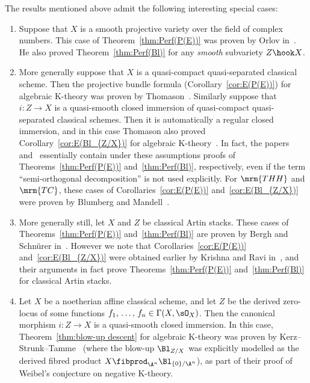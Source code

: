 The results mentioned above admit the following interesting special cases:
\begin{enumerate}
\item Suppose that $X$ is a smooth projective variety over the field of complex numbers. This case of Theorem~\ref{thm:Perf(P(E))} was proven by Orlov in~\cite{OrlovSOD}. He also proved Theorem~\ref{thm:Perf(Bl)} for any \emph{smooth} subvariety $Z \hook X$.
\item More generally suppose that $X$ is a quasi-compact quasi-separated classical scheme. Then the projective bundle formula (Corollary~\ref{cor:E(P(E))}) for algebraic K-theory was proven by Thomason~\cite{ThomasonProjectiveBundle,ThomasonTrobaugh}. Similarly suppose that $i : Z \to X$ is a quasi-smooth closed immersion of quasi-compact quasi-separated classical schemes. Then it is automatically a regular closed immersion, and in this case Thomason also proved Corollary~\ref{cor:E(Bl_{Z/X})} for algebraic K-theory~\cite{ThomasonBlowup}. In fact, the papers~\cite{ThomasonProjectiveBundle} and~\cite{ThomasonBlowup} essentially contain under these assumptions proofs of Theorems~\ref{thm:Perf(P(E))} and~\ref{thm:Perf(Bl)}, respectively, even if the term ``semi-orthogonal decomposition'' is not used explicitly. For $\mrm{THH}$ and $\mrm{TC}$, these cases of Corollaries~\ref{cor:E(P(E))} and~\ref{cor:E(Bl_{Z/X})} were proven by Blumberg and Mandell~\cite{BlumbergMandellTHH}.

\item More generally still, let $X$ and $Z$ be classical Artin stacks. These cases of Theorems~\ref{thm:Perf(P(E))} and~\ref{thm:Perf(Bl)} are proven by Bergh and Schn\"urer in~\cite{BerghSchnuerer}. However we note that Corollaries~\ref{cor:E(P(E))} and~\ref{cor:E(Bl_{Z/X})} were obtained earlier by Krishna and Ravi in~\cite{KrishnaRavi}, and their arguments in fact prove Theorems~\ref{thm:Perf(P(E))} and~\ref{thm:Perf(Bl)} for classical Artin stacks.

\item Let $X$ be a noetherian affine classical scheme, and let $Z$ be the derived zero-locus of some functions $f_1,\,\ldots,\,f_n \in \Gamma(X, \sO_X)$. Then the canonical morphism $i : Z \to X$ is a quasi-smooth closed immersion. In this case, Theorem~\ref{thm:blow-up descent} for algebraic K-theory was proven by Kerz--Strunk--Tamme~\cite{KerzStrunkTamme} (where the blow-up $\Bl_{Z/X}$ was explicitly modelled as the derived fibred product $X \fibprod_{\A^n} \Bl_{\{0\}/\A^n}$), as part of their proof of Weibel's conjecture on negative K-theory.
\end{enumerate}

